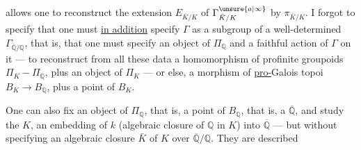 allows one to reconstruct the extension $E_{\bar K/K}$ of $\Gamma^{\unsure{a|\infty}}_{\bar K/K}$ by $\pi_{\bar K/K}$. I forgot to specify that one must \uline{in addition} specify $\Gamma$ as a subgroup of a well-determined $\Gamma_{\overline{\mathbb Q}/\mathbb Q}$, that is, that one must specify an object of $\Pi_{\mathbb Q}$ and a faithful action of $\Gamma$ on it --- to reconstruct from all these data a homomorphism of profinite groupoids $\Pi_K-\Pi_{\mathbb Q}$, plus an object of $\Pi_K$ --- or else, a morphism of \uline{pro-}Galois topoi $B_K\longrightarrow B_{\mathbb Q}$, plus a point of $B_K$.

One can also fix an object of $\Pi_{\mathbb Q}$, that is, a point of $B_{\mathbb Q}$, that is, a $\overline{\mathbb Q}$, and study the $K$,  an embedding of $k$ (algebraic closure of $\mathbb Q$ in $K$) into $\overline{\mathbb Q}$ ---  but without specifying an algebraic closure $\bar K$ of $K$ over $\overline{\mathbb Q}/\mathbb Q$. They are described
